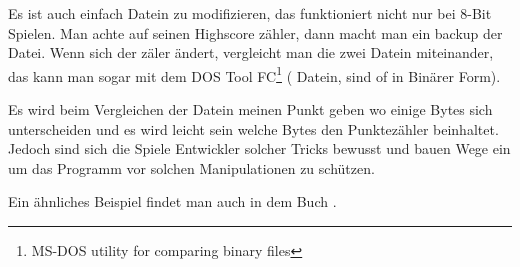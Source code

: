 

Es ist auch einfach  Datein zu modifizieren, das funktioniert nicht nur bei 8-Bit Spielen. Man achte 
auf seinen Highscore zähler, dann macht man ein backup der Datei. Wenn sich der  zäler ändert, vergleicht man die 
zwei Datein miteinander, das kann man sogar mit dem DOS Tool FC\footnote{MS-DOS utility for comparing binary files} ( Datein,
sind of in Binärer Form). 


Es wird beim Vergleichen der Datein meinen Punkt geben wo einige Bytes sich unterscheiden und 
es wird leicht sein welche Bytes den Punktezähler beinhaltet. 
Jedoch sind sich die Spiele Entwickler solcher Tricks bewusst und bauen Wege ein um das Programm
vor solchen Manipulationen zu schützen. 

Ein ähnliches Beispiel findet man auch in dem Buch .


